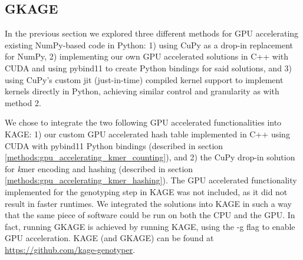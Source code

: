 \subsection{GKAGE} \label{results:gkage}
In the previous section we explored three different methods for GPU accelerating existing NumPy-based code in Python: 
1) using CuPy as a drop-in replacement for NumPy,
2) implementing our own GPU accelerated solutions in C++ with CUDA and using pybind11 to create Python bindings for said solutions, 
and 3) using CuPy's custom jit (just-in-time) compiled kernel support to implement kernels directly in Python, achieving similar control and granularity as with method 2.

We chose to integrate the two following GPU accelerated functionalities into KAGE:
1) our custom GPU accelerated hash table implemented in C++ using CUDA with pybind11 Python bindings (described in section \ref{methods:gpu_accelerating_kmer_counting}), and
2) the CuPy drop-in solution for \textit{k}mer encoding and hashing (described in section \ref{methods:gpu_accelerating_kmer_hashing}).
The GPU accelerated functionality implemented for the genotyping step in KAGE was not included, as it did not result in faster runtimes.
We integrated the solutions into KAGE in such a way that the same piece of software could be run on both the CPU and the GPU.
In fact, running GKAGE is achieved by running KAGE, using the -g flag to enable GPU acceleration.
KAGE (and GKAGE) can be found at \url{https://github.com/kage-genotyper}.

